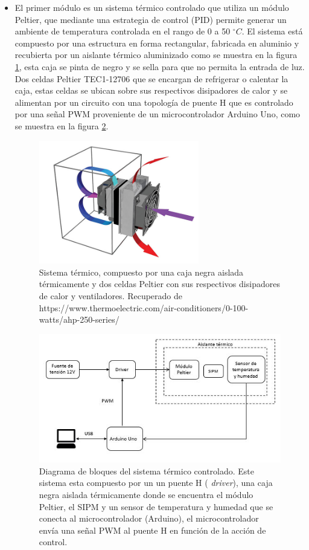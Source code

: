 \documentclass[11pt,letterpaper,oneside]{book}
\begin{document}
\begin{itemize}
\item El primer módulo es un sistema térmico controlado que utiliza un módulo Peltier, que mediante una estrategia de control (PID) permite generar un ambiente de temperatura controlada en el rango de 0 a 50 $ ^ \circ C$. El sistema está compuesto por una estructura en forma rectangular, fabricada en aluminio y recubierta por un aislante térmico aluminizado como se muestra en la figura \ref{cam_ter}, esta caja se pinta de negro y se sella para que no permita la entrada de luz. Dos celdas Peltier TEC1-12706 que se encargan de refrigerar o calentar  la caja, estas celdas se ubican sobre sus respectivos disipadores de calor y se alimentan por un circuito con una topología de puente H que es controlado por una señal PWM \cite{Peltier_SIPM} proveniente de un microcontrolador Arduino Uno, como se muestra en la figura \ref{Diag_cam}.  
\begin{figure}[ht]
  \centering
  	\includegraphics[width=7cm]{camara.jpg}
  	\caption{Sistema térmico, compuesto por una caja negra aislada térmicamente y dos celdas Peltier con sus respectivos disipadores de calor y ventiladores. Recuperado de https://www.thermoelectric.com/air-conditioners/0-100-watts/ahp-250-series/}
	\label{cam_ter}
\end{figure}

\begin{figure}[ht]
  \centering
  	\includegraphics[width=12cm]{Diagrama_Camara.JPG}
  	\caption{Diagrama de bloques del sistema térmico controlado. Este sistema esta compuesto por un un puente H (\textit{ driver}), una caja negra aislada térmicamente donde se encuentra el módulo Peltier, el SIPM y un sensor de temperatura y humedad que se conecta al microcontrolador (Arduino), el microcontrolador envía una señal PWM al puente H en función de la acción de control.}
	\label{Diag_cam}
\end{figure}

\end{itemize} 
\end{document}
